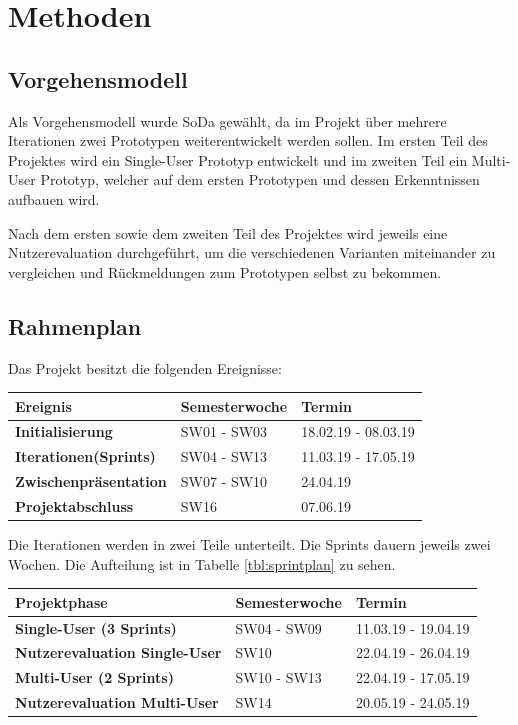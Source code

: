 \chapter{Methoden}
\label{ch:Methoden}

\section{Vorgehensmodell}
Als Vorgehensmodell wurde SoDa gewählt, da im Projekt über mehrere Iterationen zwei Prototypen weiterentwickelt werden sollen. Im ersten Teil des Projektes wird ein Single-User Prototyp entwickelt und im zweiten Teil ein Multi-User Prototyp, welcher auf dem ersten Prototypen und dessen Erkenntnissen aufbauen wird.

\noindent Nach dem ersten sowie dem zweiten Teil des Projektes wird jeweils eine Nutzerevaluation durchgeführt, um die verschiedenen Varianten miteinander zu vergleichen und Rückmeldungen zum Prototypen selbst zu bekommen.

\section{Rahmenplan}
Das Projekt besitzt die folgenden Ereignisse:
\begin{center}
	\begin{tabular}	{ |l|l|l| }
		\hline
		\rowcolor{black}
		\color{white} \textbf{Ereignis} & \color{white} \textbf{Semesterwoche} & 
		\color{white} \textbf{Termin} \\
		\hline
		\textbf{Initialisierung} & SW01 - SW03 & 18.02.19 - 08.03.19 \\
		\hline
		\textbf{Iterationen(Sprints)} & SW04 - SW13 & 11.03.19 - 17.05.19 \\
		\hline
		\textbf{Zwischenpräsentation} & SW07 - SW10 & 24.04.19 \\
		\hline
		\textbf{Projektabschluss} & SW16 & 07.06.19 \\
		\hline		
	\end{tabular}
\end{center}
\label{tbl:rahmenplan}

\bigskip
Die Iterationen werden in zwei Teile unterteilt. Die Sprints dauern jeweils zwei Wochen. Die Aufteilung ist in Tabelle \ref{tbl:sprintplan} zu sehen.
\begin{center}
	\begin{tabular}	{ |l|l|l| }
		\hline
		\rowcolor{black}
		\color{white} \textbf{Projektphase} & \color{white} \textbf{Semesterwoche} & 
		\color{white} \textbf{Termin} \\
		\hline
		\textbf{Single-User (3 Sprints)} & SW04 - SW09 & 11.03.19 - 19.04.19 \\
		\hline
		\textbf{Nutzerevaluation Single-User} & SW10 & 22.04.19 - 26.04.19 \\
		\hline
		\textbf{Multi-User (2 Sprints)} & SW10 - SW13 & 22.04.19 - 17.05.19\\
		\hline
		\textbf{Nutzerevaluation Multi-User} & SW14 & 20.05.19 - 24.05.19 \\
		\hline		
	\end{tabular}
\end{center}
\label{tbl:sprintplan}


